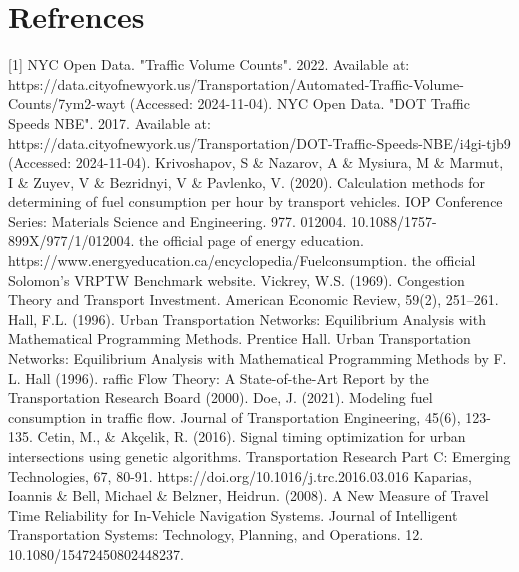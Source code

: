 \section{Refrences}
[1] NYC Open Data. "Traffic Volume Counts". 2022. Available at:
\newline
https://data.cityofnewyork.us/Transportation/Automated-Traffic-Volume-Counts/7ym2-wayt (Accessed: 2024-11-04).
\newline[2] NYC Open Data. "DOT Traffic Speeds NBE". 2017. Available at: 
\newline
https://data.cityofnewyork.us/Transportation/DOT-Traffic-Speeds-NBE/i4gi-tjb9 (Accessed: 2024-11-04).
\newline[3]Krivoshapov, S \& Nazarov, A \& Mysiura, M \& Marmut, I \& Zuyev, V \& Bezridnyi, V \& Pavlenko, V. (2020). Calculation methods for determining of fuel consumption per hour by transport vehicles. IOP Conference Series: Materials Science and Engineering. 977. 012004. 10.1088/1757-899X/977/1/012004. 
\newline
\newline[4] the official page of energy education. 
\newline
https://www.energyeducation.ca/encyclopedia/Fuelconsumption.
\newline[5] the official Solomon’s VRPTW Benchmark website. 
\newline[6]Vickrey, W.S. (1969). Congestion Theory and Transport Investment. American Economic Review, 59(2), 251–261.
\newline[7]Hall, F.L. (1996). Urban Transportation Networks: Equilibrium Analysis with Mathematical Programming Methods. Prentice Hall.
\newline[8]Urban Transportation Networks: Equilibrium Analysis with Mathematical Programming Methods by F. L. Hall (1996).
\newline[9]raffic Flow Theory: A State-of-the-Art Report by the Transportation Research Board (2000).
\newline[10]Doe, J. (2021). Modeling fuel consumption in traffic flow. Journal of Transportation Engineering, 45(6), 123-135.
\newline[11]Cetin, M., \& Akçelik, R. (2016). Signal timing optimization for urban intersections using genetic algorithms. Transportation Research Part C: Emerging Technologies, 67, 80-91. https://doi.org/10.1016/j.trc.2016.03.016
\newline[12]Kaparias, Ioannis \& Bell, Michael \& Belzner, Heidrun. (2008). A New Measure of Travel Time Reliability for In-Vehicle Navigation Systems. Journal of Intelligent Transportation Systems: Technology, Planning, and Operations. 12. 10.1080/15472450802448237. 
